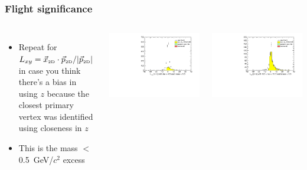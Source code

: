\documentclass[compress]{beamer}
\newcommand{\s}[1]{{\mbox{\scriptsize #1}}}
\begin{document}
\begin{frame}
\frametitle{Flight significance}

\begin{columns}
\begin{itemize}
\item Repeat for $L_{xy} = \vec{x}_\s{\tiny 2D} \cdot \vec{p}_\s{\tiny 2D} /
  |\vec{p}_\s{\tiny 2D}|$ in case you think there's a bias in using $z$
  because the closest primary vertex was identified using closeness in $z$

\item This is the mass $<$ 0.5~GeV/$c^2$ excess
\end{itemize}

\includegraphics[width=\linewidth]{lowdimuon_lxy_lowmass_isolated.pdf}

\includegraphics[width=\linewidth]{lowdimuon_lxy_lowmass_isosideband.pdf}


\end{columns}
\end{frame}
\end{document}
